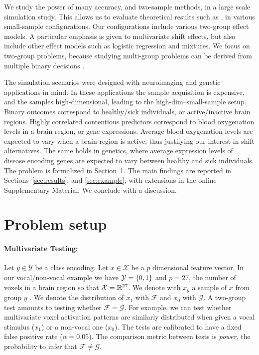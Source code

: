 \documentclass[oupdraft]{bio}
\begin{document}
We study the power of many accuracy, and two-sample methods, in a large scale simulation study. 
This allows us to evaluate theoretical results such as \citet{ramdas_classification_2016}, in various small-sample configurations.
Our configurations include various two-group effect models. 
A particular emphasis is given to multivariate shift effects, but also include other effect models such as logistic regression and  mixtures. 
We focus on two-group problems, because studying multi-group problems can be derived from multiple binary decisions \citep{zheng2018extrapolating}.

The simulation scenarios were designed with neuroimaging and genetic applications in mind. 
In these applications the sample acquisition is expensive, and the samples high-dimensional, leading to the high-dim--small-sample setup.
Binary outcomes correspond to healthy/sick individuals, or active/inactive brain regions.
Highly correlated contentious predictors correspond to blood oxygenation levels in a brain region, or gene expressions.
Average blood oxygenation levels are expected to vary when a brain region is active, thus justifying our interest in shift alternatives. 
The same holds in genetics, where average expression levels of disease encoding genes are expected to vary between healthy and sick individuals. 
The problem is formalized in Section~\ref{sec:problem_setup}.
The main findings are reported in Sections~\ref{sec:results}, and \ref{sec:example}, with extensions in the online Supplementary Material. 
We conclude with a discussion.







\section{Problem setup}
\label{sec:problem_setup}


\paragraph{Multivariate Testing:}

Let $y \in \mathcal{Y}$ be a class encoding. 
Let $x \in \mathcal{X}$ be a $p$ dimensional feature vector. 
In our vocal/non-vocal example we have $\mathcal{Y}=\{ 0,1 \}$ and $p=27$, the number of voxels in a brain region so that $\mathcal{X}=\mathbb{R}^{27}$. 
We denote with $x_y$ a sample of $x$ from group $y$ .
We denote the distribution of $x_1$ with $\mathcal{F}$ and $x_0$ with $\mathcal{G}$.
A two-group test amounts to testing whether $\mathcal{F}=\mathcal{G}$.
For example, we can test whether multivariate voxel activation patterns are similarly distributed when given a vocal stimulus ($x_1$) or a non-vocal one ($x_0$).
The tests are calibrated to have a fixed false positive rate ($\alpha=0.05$).
The comparison metric between tests is \emph{power}, the probability to infer that $\mathcal{F}\neq\mathcal{G}$.
\end{document}

